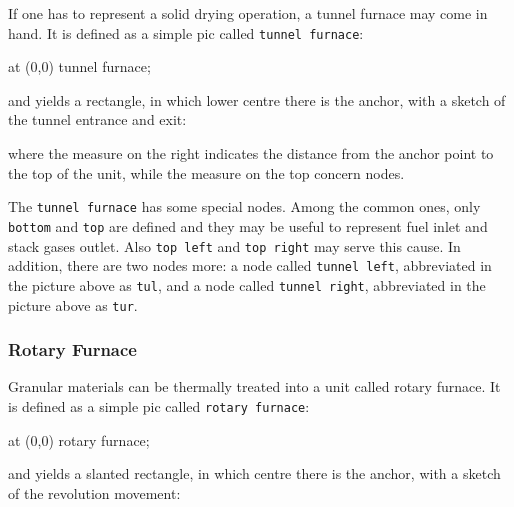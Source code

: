 \documentclass[12pt]{article}						%
\newcommand*{\chpn}[1]{\texttt{#1}}				%
\newcommand*{\chpp}[1]{\texttt{#1}}				%
\begin{document}
If one has to represent a solid drying operation, a tunnel furnace may come in
hand. It is defined as a simple pic called \chpp{tunnel furnace}:
\begin{chpcode}
	\pic at (0,0) {tunnel furnace};
\end{chpcode}
and yields a rectangle, in which lower centre there is the anchor, with a sketch
of the tunnel entrance and exit:
\begin{center}
\end{center}
where the measure on the right indicates the distance from the anchor point to
the top of the unit, while the measure on the top concern nodes.

The \chpp{tunnel furnace} has some special nodes. Among the common ones, only
\chpn{bottom} and \chpn{top} are defined and they may be useful to represent
fuel inlet and stack gases outlet. Also \chpn{top left} and \chpn{top right} may
serve this cause. In addition, there are two nodes more: a node called
\chpn{tunnel left}, abbreviated in the picture above as \chpn{tul}, and a
node called \chpn{tunnel right}, abbreviated in the picture above as \chpn{tur}.

\subsubsection{Rotary Furnace}

Granular materials can be thermally treated into a unit called rotary furnace. It
is defined as a simple pic called \chpp{rotary furnace}:
\begin{chpcode}
	\pic at (0,0) {rotary furnace};
\end{chpcode}
and yields a slanted rectangle, in which centre there is the anchor, with a
sketch of the revolution movement:
\begin{center}
\end{center}
\end{document}
